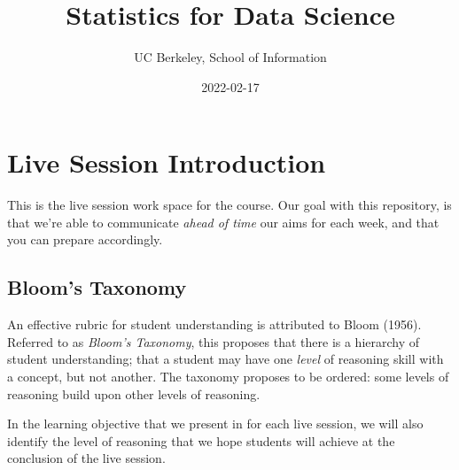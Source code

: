 \documentclass[
]{book}
\title{Statistics for Data Science}
\author{UC Berkeley, School of Information}
\date{2022-02-17}
\theoremstyle{definition}
\theoremstyle{definition}
\theoremstyle{definition}
\theoremstyle{definition}
\theoremstyle{remark}
\begin{document}
\maketitle

{
\setcounter{tocdepth}{1}
\tableofcontents
}
\hypertarget{live-session-introduction}{%
\chapter*{Live Session Introduction}\label{live-session-introduction}}

This is the live session work space for the course. Our goal with this repository, is that we're able to communicate \emph{ahead of time} our aims for each week, and that you can prepare accordingly.

\hypertarget{blooms-taxonomy}{%
\section*{Bloom's Taxonomy}\label{blooms-taxonomy}}

An effective rubric for student understanding is attributed to Bloom (1956). Referred to as \emph{Bloom's Taxonomy}, this proposes that there is a hierarchy of student understanding; that a student may have one \emph{level} of reasoning skill with a concept, but not another. The taxonomy proposes to be ordered: some levels of reasoning build upon other levels of reasoning.

In the learning objective that we present in for each live session, we will also identify the level of reasoning that we hope students will achieve at the conclusion of the live session.
\end{document}
